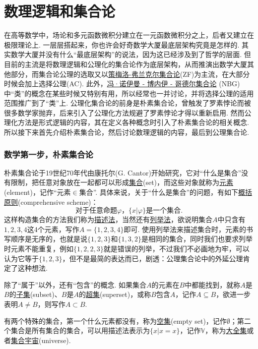\documentclass[main.tex]{subfiles}
\begin{document}
\tableofcontents

\part{数理逻辑和集合论}

在高等数学中，场论和多元函数微积分建立在一元函数微积分之上，后者又建立在极限理论上. 一层层搭起来，你也许会好奇数学大厦最底层架构究竟是怎样的. 其实数学大厦并没有什么“最底层架构”的说法，因为这已经涉及到了哲学的层面. 但目前的主流是将数理逻辑和公理化的集合论作为底层架构，从而推演出数学大厦其他部分，而集合论公理的选取又以\uline{策梅洛-弗兰克尔集合论}(\textsf{ZF})为主流，在大部分时候会加上选择公理(AC). 此外，\uline{冯·诺伊曼 - 博内伊 - 哥德尔集合论} (\textsf{NBG})中“类”的概念在某些时候又特别有用，所以经常也一并讨论，并将选择公理的适用范围推广到了“类”上. 公理化集合论的前身是朴素集合论，曾触发了罗素悖论而被很多数学家抛弃，后来引入了公理化方法规避了罗素悖论才得以重新启用. 然而公理化方法是形式逻辑的内容，其在定义各种概念时引入了朴素集合论的相关概念. 所以接下来首先介绍朴素集合论，然后讨论数理逻辑的内容，最后到公理集合论.

\section{数学第一步，朴素集合论}

朴素集合论于19世纪70年代由康托尔(G. Cantor)开始研究，它对“什么是集合”没有限制，把任意对象放在一起都可以形成\uline{集合}(set)，而这些对象就称为\uline{元素}(element)，记作“元素\(\in\)集合”. 具体来说，关于“什么是集合”的问题，有如下\uline{概括原则}(comprehensive scheme)：
\[\mbox{对于任意命题}\varphi\mbox{，}\{x|\varphi\}\mbox{是一个集合.}\]
这样构造集合的方法我们称为\uline{描述法}，当然还有\uline{列举法}，欲说明集合\(A\)中只含有\(1,2,3,4\)这4个元素，写作\(A=\{1,2,3,4\}\)即可. 使用列举法来描述集合时，元素的书写顺序是无序的，也就是说\(\{1,2,3\}\)和\(\{1,3,2\}\)是相同的集合，同时我们也要求列举时元素不能重复，例如\(\{1,2,2,3\}\)就是错误的列举，不过我们不必画地为牢，可以认为它等于\(\{1,2,3\}\)，但不是最简的表达而已，剧透：公理集合论中的外延公理肯定了这种想法.

除了“属于”以外，还有“包含”的概念. 如果集合\(A\)的元素在\(B\)中都能找到，就称\(A\)是\(B\)的\uline{子集}(subset)、\(B\)是\(A\)的\uline{超集}(superset)，或称\(B\)包含\(A\)，记作\(A \subseteq B\)，欲进一步表明\(A \neq B\)，则写作\(A \subset B\).

有两个特殊的集合，第一个什么元素都没有，称为\uline{空集}(empty set)，记作\(\emptyset\)；第二个集合是所有集合的集合，可以用描述法表示为\(\{x|x=x\}\)，记作\(\mathbb{V}\)，称为\uline{大全集}或者\uline{集合宇宙}(universe).
\end{document}
